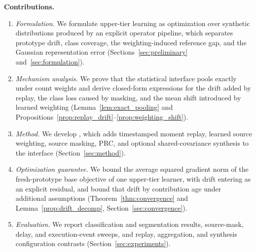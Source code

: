 \noindent\textbf{Contributions.}~
\begin{enumerate}
    \item \emph{Formulation.} We formulate upper-tier learning as optimization over synthetic distributions produced by an explicit operator pipeline, which separates prototype drift, class coverage, the weighting-induced reference gap, and the Gaussian representation error (Sections~\ref{sec:preliminary} and~\ref{sec:formulation}).
    \item \emph{Mechanism analysis.} We prove that the statistical interface pools exactly under count weights and derive closed-form expressions for the drift added by replay, the class loss caused by masking, and the mean shift introduced by learned weighting (Lemma~\ref{lem:exact_pooling} and Propositions~\ref{prop:replay_drift}--\ref{prop:weighting_shift}).
    \item \emph{Method.} We develop \ehsfp{}, which adds timestamped moment replay, learned source weighting, source masking, PRC, and optional shared-covariance synthesis to the \hsfp{} interface (Section~\ref{sec:method}).
    \item \emph{Optimization guarantee.} We bound the average squared gradient norm of the fresh-prototype base objective of one upper-tier learner, with drift entering as an explicit residual, and bound that drift by contribution age under additional assumptions (Theorem~\ref{thm:convergence} and Lemma~\ref{prop:drift_decomp}, Section~\ref{sec:convergence}).
    \item \emph{Evaluation.} We report classification and segmentation results, source-mask, delay, and execution-event sweeps, and replay, aggregation, and synthesis configuration contrasts (Section~\ref{sec:experiments}).
\end{enumerate}
